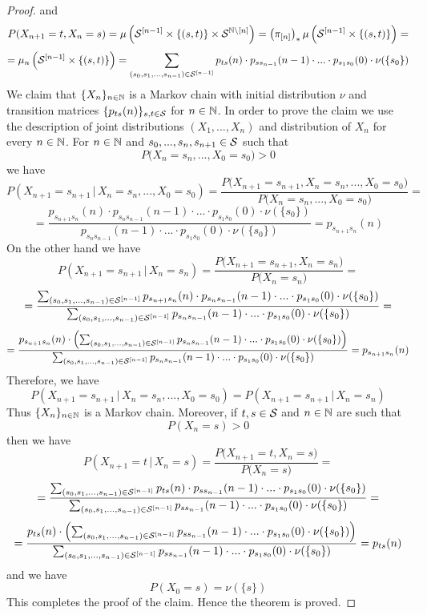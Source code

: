 \begin{proof}
and
$$P(X_{n+1} = t,X_n=s) = \mu\left({\mathcal S}^{[n-1]}\times \{(s,t)\}\times {\mathcal S}^{{\mathbb N}\setminus [n]}\right) = \left(\pi_{[n]}\right)_*\mu\left({\mathcal S}^{[n-1]}\times \{(s,t)\}\right) =$$
$$= \mu_n\left({\mathcal S}^{[n-1]}\times \{(s,t)\}\right) = \sum_{(s_0,s_1,...,s_{n-1})\in {\mathcal S}^{[n-1]}}p_{ts}(n)\cdot p_{ss_{n-1}}(n-1)\cdot ... \cdot p_{s_1s_0}(0) \cdot \nu(\{s_0\})$$
We claim that $\{X_n\}_{n\in {\mathbb N}}$ is a Markov chain with initial distribution $\nu$ and transition matrices $\{p_{ts}(n)\}_{s,t\in {\mathcal S}}$ for $n\in {\mathbb N}$. In order to prove the claim we use the description of joint distributions $(X_1,...,X_n)$ and distribution of $X_n$ for every $n\in {\mathbb N}$. For $n\in {\mathbb N}$ and $s_0,...,s_n,s_{n+1}\in {\mathcal S}$ such that
$$P\big(X_n=s_n,...,X_0=s_0\big) > 0$$
we have
$$P\left(X_{n+1}=s_{n+1}\,|\,X_n=s_n,...,X_0=s_0\right) = \frac{P\big(X_{n+1}=s_{n+1},X_n=s_n,...,X_0=s_0\big)}{P\big(X_n=s_n,...,X_0=s_0\big)} =$$
$$= \frac{p_{s_{n+1}s_n}(n)\cdot p_{s_ns_{n-1}}(n-1)\cdot ... \cdot p_{s_1s_0}(0) \cdot \nu(\{s_0\})}{p_{s_ns_{n-1}}(n-1)\cdot ... \cdot p_{s_1s_0}(0) \cdot \nu(\{s_0\})} = p_{s_{n+1}s_n}(n)$$
On the other hand we have
$$P\left(X_{n+1}=s_{n+1}\,|\,X_n=s_n\right) = \frac{P\big(X_{n+1}=s_{n+1},X_n=s_n\big)}{P\big(X_n=s_n\big)} = $$
$$=\frac{\sum_{(s_0,s_1,...,s_{n-1})\in {\mathcal S}^{[n-1]}}p_{s_{n+1}s_{n}}(n)\cdot p_{s_ns_{n-1}}(n-1)\cdot ... \cdot p_{s_1s_0}(0) \cdot \nu(\{s_0\})}{\sum_{(s_0,s_1,...,s_{n-1})\in {\mathcal S}^{[n-1]}}p_{s_ns_{n-1}}(n-1)\cdot ... \cdot p_{s_1s_0}(0) \cdot \nu(\{s_0\})} =$$
$$= \frac{p_{s_{n+1}s_{n}}(n)\cdot \left(\sum_{(s_0,s_1,...,s_{n-1})\in {\mathcal S}^{[n-1]}} p_{s_ns_{n-1}}(n-1)\cdot ... \cdot p_{s_1s_0}(0) \cdot \nu(\{s_0\})\right)}{\sum_{(s_0,s_1,...,s_{n-1})\in {\mathcal S}^{[n-1]}}p_{s_ns_{n-1}}(n-1)\cdot ... \cdot p_{s_1s_0}(0) \cdot \nu(\{s_0\})} = p_{s_{n+1}s_n}(n)$$
Therefore, we have
$$P\left(X_{n+1}=s_{n+1}\,|\,X_n=s_n,...,X_0=s_0\right) = P\left(X_{n+1}=s_{n+1}\,|\,X_n=s_n\right)$$
Thus $\{X_n\}_{n\in {\mathbb N}}$ is a Markov chain. Moreover, if $t,s\in {\mathcal S}$ and $n\in {\mathbb N}$ are such that
$$P(X_n = s) > 0$$
then we have
$$P\left(X_{n+1}=t\,|\,X_n=s\right) = \frac{P\big(X_{n+1}=t,X_n=s\big)}{P\big(X_n=s\big)} = $$
$$=\frac{\sum_{(s_0,s_1,...,s_{n-1})\in {\mathcal S}^{[n-1]}}p_{ts}(n)\cdot p_{ss_{n-1}}(n-1)\cdot ... \cdot p_{s_1s_0}(0) \cdot \nu(\{s_0\})}{\sum_{(s_0,s_1,...,s_{n-1})\in {\mathcal S}^{[n-1]}}p_{ss_{n-1}}(n-1)\cdot ... \cdot p_{s_1s_0}(0) \cdot \nu(\{s_0\})} =$$
$$= \frac{p_{ts}(n)\cdot \left(\sum_{(s_0,s_1,...,s_{n-1})\in {\mathcal S}^{[n-1]}} p_{ss_{n-1}}(n-1)\cdot ... \cdot p_{s_1s_0}(0) \cdot \nu(\{s_0\})\right)}{\sum_{(s_0,s_1,...,s_{n-1})\in {\mathcal S}^{[n-1]}}p_{ss_{n-1}}(n-1)\cdot ... \cdot p_{s_1s_0}(0) \cdot \nu(\{s_0\})} = p_{ts}(n)$$
and we have
$$P(X_0 = s) = \nu(\{s\})$$
This completes the proof of the claim. Hence the theorem is proved.
\end{proof}
    
